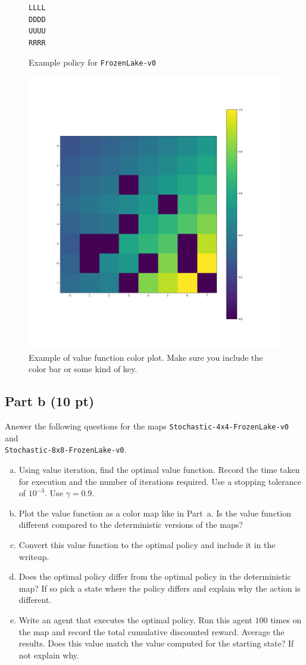 \documentclass[12pt]{article}
\begin{document}
\begin{figure}[ht]
  \centering
  \begin{BVerbatim}
LLLL
DDDD
UUUU
RRRR
  \end{BVerbatim}
  \caption{\label{fig:prob2_example_policy} Example policy for \texttt{FrozenLake-v0}}
\end{figure}

\begin{figure}[ht]
  \centering
  \includegraphics[width=.5\textwidth]{figures/value_function_plot.png}
  \caption{\label{fig:prob3_value_image} Example of value function
    color plot. Make sure you include the color bar or some kind of key.}
\end{figure}


\subsection*{Part b (10 pt)}

Answer the following questions for the maps
\texttt{Stochastic-4x4-FrozenLake-v0} and \\
\texttt{Stochastic-8x8-FrozenLake-v0}.

\begin{enumerate}[a)]
\item Using value iteration, find the optimal value function. Record
  the time taken for execution and the number of iterations required. Use a
  stopping tolerance of $10^{-3}$. Use $\gamma=0.9$.
\item Plot the value function as a color map like in Part~a. Is the
  value function different compared to the deterministic versions of
  the maps?
\item Convert this value function to the optimal policy and include it
  in the writeup.
\item Does the optimal policy differ from the optimal policy in the 
  deterministic map? 
  If so pick a state where the policy differs and explain why the action is
  different.
\item Write an agent that executes the optimal policy. Run this agent
  $100$ times on the map and record the total cumulative discounted
  reward. Average the results. Does this value match the value
  computed for the starting state? If not explain why.
\end{enumerate}
\end{document}
